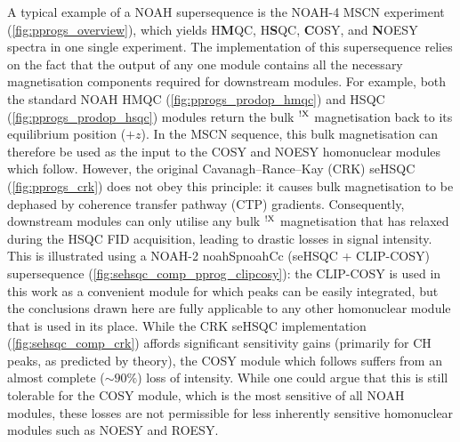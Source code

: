 \documentclass[11pt]{article}
\newcommand*{\noahtwo}[2]{\csname noah#1\endcsname\csname noah#2\endcsname}
\newcommand*{\carbon}{\ce{^{13}C}}
\newcommand*{\nitrogen}{\ce{^{15}N}}
\newcommand*{\magnnot}[1]{\ce{^1H}$^{!#1}$}
\begin{document}
\begin{refsection}
A typical example of a NOAH supersequence is the NOAH-4 MSCN experiment (\cref{fig:pprogs_overview}), which yields \nitrogen{} H\textbf{M}QC, \carbon{} H\textbf{S}QC, \textbf{C}OSY, and \textbf{N}OESY spectra in one single experiment.\autocite{Kupce2017ACIE}
The implementation of this supersequence relies on the fact that the output of any one module contains all the necessary magnetisation components required for downstream modules.
For example, both the standard NOAH HMQC (\cref{fig:pprogs_prodop_hmqc})\autocite{Kupce2017ACIE, Kupce2007MRC} and HSQC (\cref{fig:pprogs_prodop_hsqc})\autocite{Kupce2017ACIE, SchulzeSunninghausen2017JMR} modules return the bulk \magnnot{\ce{X}} magnetisation back to its equilibrium position ($+z$).
In the MSCN sequence, this bulk magnetisation can therefore be used as the input to the COSY and NOESY homonuclear modules which follow.
However, the original Cavanagh--Rance--Kay (CRK) seHSQC (\cref{fig:pprogs_crk}) does not obey this principle: it causes bulk magnetisation to be dephased by coherence transfer pathway (CTP) gradients.
Consequently, downstream modules can only utilise any bulk \magnnot{\ce{X}} magnetisation that has relaxed during the HSQC FID acquisition, leading to drastic losses in signal intensity.
This is illustrated using a NOAH-2 \noahtwo{Sp}{Cc} (seHSQC + CLIP-COSY\autocite{Koos2016ACIE}) supersequence (\cref{fig:sehsqc_comp_pprog_clipcosy}): the CLIP-COSY is used in this work as a convenient module for which peaks can be easily integrated, but the conclusions drawn here are fully applicable to any other homonuclear module that is used in its place.
While the CRK seHSQC implementation (\cref{fig:sehsqc_comp_crk}) affords significant sensitivity gains (primarily for CH peaks, as predicted by theory\autocite{sehsqc_sens}), the COSY module which follows suffers from an almost complete ($\sim 90\%$) loss of intensity.
While one could argue that this is still tolerable for the COSY module, which is the most sensitive of all NOAH modules, these losses are not permissible for less inherently sensitive homonuclear modules such as NOESY and ROESY.


\end{refsection}
\end{document}
